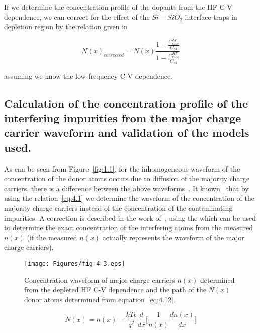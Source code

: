 \par If we determine the concentration profile of the dopants from the
HF C-V dependence, we can correct for the effect of the $Si-SiO_{2}$
interface traps in depletion region by the relation given
in~\cite{I.1}

\begin{equation}\label{eq:4.11}
  {N(x)}_{corrected} = {N(x)}{\frac{1-\frac{C_{mos}^{LF}}{C_{ox}}}{1-\frac{C_{mos}^{HF}}{C_{ox}}}}
\end{equation}

assuming we know the low-frequency C-V dependence.

\subsection[Calculation of the concentration profile of the interfering impurities from the major charge carrier waveform and validation of the models used.]{Calculation of the concentration profile of the interfering impurities from the major charge carrier waveform and validation of the models used.}\label{sec:4.1.4}

As can be seen from Figure~\ref{fig:1.1}, for the inhomogeneous
waveform of the concentration of the donor atoms occurs due to
diffusion of the majority charge carriers, there is a difference
between the above waveforms~\cite{4.16}. It known~\cite{4.17} that by
using the relation~\ref{eq:4.1} we determine the waveform of the
concentration of the majority charge carriers instead of the
concentration of the contaminating impurities. A correction is
described in the work of~\cite{4.18}, using the which can be used to
determine the exact concentration of the interfering atoms from the
measured $n (x)$ (if the measured $n (x)$ actually represents the
waveform of the major charge carriers).

\begin{figure}[h!]\centering
  \texttt{[image: Figures/fig-4-3.eps]}
  \caption[Majority charge carrier concentration $n(x)$ determined
    from the depleted HF C-V dependence and the progression of the
    donating atoms $N (x)$ determined from the
    equation~\ref{eq:4.12}]{Concentration waveform of major charge
    carriers $n (x)$ determined from the depleted HF C-V dependence and
    the path of the $N (x)$ donor atoms determined from
    equation~\ref{eq:4.12}.}\label{fig:4.3}
\end{figure}

\begin{equation}\label{eq:4.12}
  N(x) = n(x) - {\frac{kT\epsilon}{q^{2}} {\frac{d}{dx}} {\Bigg[\frac{1}{n(x)}\frac{dn(x)}{dx}\Bigg]}}
\end{equation}

